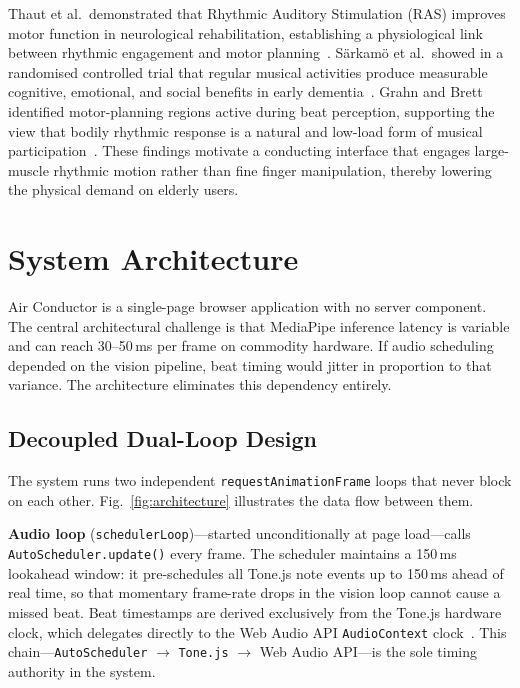 \documentclass[conference]{IEEEtran}
\begin{document}
Thaut et al.\ demonstrated that Rhythmic Auditory Stimulation (RAS)
improves motor function in neurological rehabilitation, establishing a
physiological link between rhythmic engagement and motor
planning~\cite{rw8}. S\"{a}rkam\"{o} et al.\ showed in a randomised
controlled trial that regular musical activities produce measurable
cognitive, emotional, and social benefits in early
dementia~\cite{rw9}. Grahn and Brett identified motor-planning regions
active during beat perception, supporting the view that bodily rhythmic
response is a natural and low-load form of musical
participation~\cite{rw10}. These findings motivate a conducting
interface that engages large-muscle rhythmic motion rather than fine
finger manipulation, thereby lowering the physical demand on elderly
users.

\section{System Architecture}
\label{sec:arch}

Air Conductor is a single-page browser application with no server
component. The central architectural challenge is that MediaPipe
inference latency is variable and can reach 30--50\,ms per frame on
commodity hardware. If audio scheduling depended on the vision pipeline,
beat timing would jitter in proportion to that variance. The
architecture eliminates this dependency entirely.

\subsection{Decoupled Dual-Loop Design}

The system runs two independent \texttt{requestAnimationFrame} loops
that never block on each other. Fig.~\ref{fig:architecture} illustrates
the data flow between them.

\textbf{Audio loop} (\texttt{schedulerLoop})---started unconditionally
at page load---calls \texttt{AutoScheduler.update()} every frame. The
scheduler maintains a 150\,ms lookahead window: it pre-schedules all
Tone.js note events up to 150\,ms ahead of real time, so that momentary
frame-rate drops in the vision loop cannot cause a missed beat. Beat
timestamps are derived exclusively from the Tone.js hardware clock,
which delegates directly to the Web Audio API \texttt{AudioContext}
clock~\cite{rw13}. This chain---\texttt{AutoScheduler} $\to$
\texttt{Tone.js} $\to$ Web Audio API---is the sole timing authority in
the system.
\end{document}
